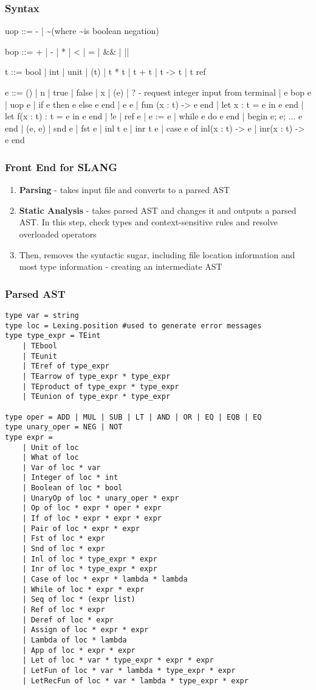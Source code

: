 \documentclass{article}
\begin{document}
\subsubsection{Syntax}
uop ::= - | \textasciitilde (where \textasciitilde is boolean negation)

bop ::= + | - | * | < | = | $\& \&$ | ||

t ::= bool | int | unit | (t) | t * t | t + t | t -> t | t ref

e ::= () | n | true | false | x | (e) | ? - request integer input from terminal | e bop e | uop e | if e then e else e end | e e | fun (x : t) -> e end | let x : t = e in e end | let f(x : t) : t = e in e end | !e | ref e | e := e | while e do e end | begin e; e; ... e end | (e, e) | snd e | fst e | inl t e | inr t e | case e of inl(x : t) -> e | inr(x : t) -> e end 

\subsubsection{Front End for SLANG}
\begin{enumerate}
	\item \textbf{Parsing} - takes input file and converts to a parsed AST
	\item \textbf{Static Analysis} - takes parsed AST and changes it and outputs a parsed AST. In this step, check types and context-sensitive rules and resolve overloaded operators
	\item Then, removes the syntactic sugar, including file location information and most type information - creating an intermediate AST
\end{enumerate}

\subsubsection{Parsed AST}
\begin{lstlisting}
type var = string
type loc = Lexing.position #used to generate error messages
type type_expr = TEint
	| TEbool
	| TEunit
	| TEref of type_expr
	| TEarrow of type_expr * type_expr
	| TEproduct of type_expr * type_expr 
	| TEunion of type_expr * type_expr
	
type oper = ADD | MUL | SUB | LT | AND | OR | EQ | EQB | EQ
type unary_oper = NEG | NOT
type expr =
	| Unit of loc
	| What of loc
	| Var of loc * var
	| Integer of loc * int
	| Boolean of loc * bool
	| UnaryOp of loc * unary_oper * expr
	| Op of loc * expr * oper * expr
	| If of loc * expr * expr * expr
	| Pair of loc * expr * expr
	| Fst of loc * expr
	| Snd of loc * expr
	| Inl of loc * type_expr * expr
	| Inr of loc * type_expr * expr
	| Case of loc * expr * lambda * lambda
	| While of loc * expr * expr
	| Seq of loc * (expr list)
	| Ref of loc * expr
	| Deref of loc * expr
	| Assign of loc * expr * expr
	| Lambda of loc * lambda
	| App of loc * expr * expr
	| Let of loc * var * type_expr * expr * expr 
	| LetFun of loc * var * lambda * type_expr * expr 
	| LetRecFun of loc * var * lambda * type_expr * expr

\end{lstlisting}
\end{document}
